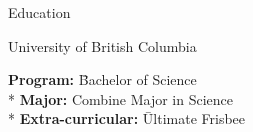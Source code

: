 \documentclass{article}
\newlength{\tabin}
\newlength{\secsep}
\newcommand{\lineunder}{\vspace*{-8pt} \\ \hspace*{-6pt} \hrulefill \\ \vspace*{-15pt}}
\newenvironment{tabbedsection}[1]{
  \begin{list}{}{
      \setlength{\itemsep}{0pt}
      \setlength{\labelsep}{0pt}
      \setlength{\labelwidth}{0pt}
      \setlength{\leftmargin}{\tabin}
      \setlength{\rightmargin}{\tabin}
      \setlength{\listparindent}{0pt}
      \setlength{\parsep}{0pt}
      \setlength{\parskip}{0pt}
      \setlength{\partopsep}{0pt}
      \setlength{\topsep}{#1}
    }
  \item[]
}{\end{list}}
\newenvironment{nospacetabbing}{
    \begin{tabbing}
}{\end{tabbing}\vspace{-1.2em}}
\newenvironment{resume_section}[1]{
  \filbreak
  \vspace{2\secsep}
  \textsc{\large#1}
  \lineunder
  \begin{tabbedsection}{\secsep}
}{\end{tabbedsection}}
\newenvironment{resume_subsection}[2][]{
  \textbf{#2} \hfill {\footnotesize #1} \hspace{-5.1em}
  \begin{tabbedsection}{0.5\secsep}
}{\end{tabbedsection}}
\begin{document}
%
\begin{resume_section}{Education}
  \begin{resume_subsection}[09/2023 - Present]{University of British Columbia}
    \begin{nospacetabbing}
      \textbf{Program:} \= Bachelor of Science\\*
      \textbf{Major:} \> Combine Major in Science \\*
      \textbf{Extra-curricular:} \= Ultimate Frisbee
    \end{nospacetabbing}
  \end{resume_subsection}
\end{resume_section}




  
\end{document}
